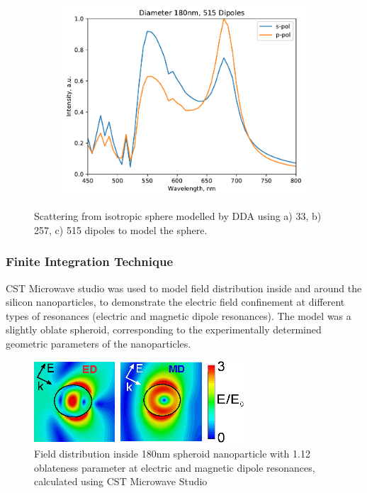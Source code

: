 \begin{figure}[h!]
\begin{subfigure}[b]{0.3\textwidth}
                    \includegraphics[width=\textwidth]{figs/methods/DDA/n_515.pdf}
                    \caption{}
                \end{subfigure}
                \caption{Scattering from isotropic sphere modelled by DDA using a) 33, b) 257, c) 515 dipoles to model the sphere.}
                \label{fig:DDA_Dipole}
            \end{figure}

        \clearpage
        \subsubsection{Finite Integration Technique}
        \label{subsec:FIT}

                CST Microwave studio was used to model field distribution inside and around the silicon nanoparticles, to
            demonstrate the electric field confinement at different types of resonances (electric and magnetic dipole resonances).
            The model was a slightly oblate spheroid, corresponding to the experimentally determined geometric parameters of the
            nanoparticles.

            \begin{figure}[!ht]
                \centering
                \includegraphics[width=0.7\textwidth]{figs/methods/FIT/CST.eps}
                \caption{Field distribution inside 180nm spheroid nanoparticle with 1.12 oblateness parameter at electric and magnetic dipole resonances,
                    calculated using CST Microwave Studio}
                \label{fig:CST}
            \end{figure}

\clearpage

